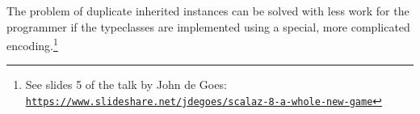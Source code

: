 The problem of duplicate inherited instances can be solved with less
work for the programmer if the typeclasses are implemented using a
special, more complicated encoding.\footnote{See slides 5 of the talk by John
de Goes: \texttt{\href{https://www.slideshare.net/jdegoes/scalaz-8-a-whole-new-game}{https://www.slideshare.net/jdegoes/scalaz-8-a-whole-new-game}}}

\begin{comment}
this tutorial is about typeclasses and type level functions to motivate
why we want to talk about this let's consider what happens if we would
like to implement the sum function generically so that the same implementation
code will work for sequence of integers for sequence of doubles and
so on if we try to do that we find that it doesn't quite work we cannot
generalize the sum function like this with a type parameter T and
an argument of type sequence of T because there is no way for us to
sum or to add values of type T where T is unknown it's arbitrary unknown
type obviously the sum function can only work for types T that in
some sense or summable another very similar situation happens if we
wanted for instance to define the F map function for factors that
already define the map function as we know F map is equivalent to
map so for each factor somebody defined already the map function we
would like to define F map for all of them at once by in the same
generic code but we cannot generalize F map to arbitrary type constructors
F here is what we would have to write suppose that we tried we would
have to put F as a type parameter F being the type constructor of
the function just as an aside in Scala this syntax is necessary if
you want to put a type parameter that is itself a type construction
you can do that just by using this syntax so if we try to write F
map like this we will have F me up with type parameters and we cannot
write this code because F in here is an arbitrary type constructor
parameter and there's no way for us to get the map function for that
F we don't even know if it exists just like here there's no way for
us to get the addition operation with some more plus or something
for the type T and just like in that case the F map could work only
for certain type constructors F namely for those that are factors
so our desire to write code more generically leads us to the need
to define functions whose type arguments for example the T and F are
not just arbitrary types but there are types that are required to
have certain properties or to belong to a certain subset of possible

\end{comment}
